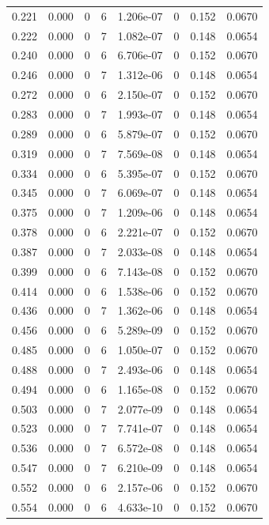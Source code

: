 \documentclass[preview]{standalone}
\begin{document}
{{\begin{tabular}{L{1.2cm}C{1.2cm} C{0.3cm}C{0.5cm} C{1.4cm}C{1.4cm} C{1.4cm}C{1.4cm}}
  0.221  &  0.000  & 0     &  6 &  1.206e-07  & 0  & 0.152 &  0.0670   \\ 
  0.222  &  0.000  & 0     &  7 &  1.082e-07  & 0  & 0.148 &  0.0654   \\ 
  0.240  &  0.000  & 0     &  6 &  6.706e-07  & 0  & 0.152 &  0.0670   \\ 
  0.246  &  0.000  & 0     &  7 &  1.312e-06  & 0  & 0.148 &  0.0654   \\ 
  0.272  &  0.000  & 0     &  6 &  2.150e-07  & 0  & 0.152 &  0.0670   \\ 
  0.283  &  0.000  & 0     &  7 &  1.993e-07  & 0  & 0.148 &  0.0654   \\ 
  0.289  &  0.000  & 0     &  6 &  5.879e-07  & 0  & 0.152 &  0.0670   \\ 
  0.319  &  0.000  & 0     &  7 &  7.569e-08  & 0  & 0.148 &  0.0654   \\ 
  0.334  &  0.000  & 0     &  6 &  5.395e-07  & 0  & 0.152 &  0.0670   \\ 
  0.345  &  0.000  & 0     &  7 &  6.069e-07  & 0  & 0.148 &  0.0654   \\ 
  0.375  &  0.000  & 0     &  7 &  1.209e-06  & 0  & 0.148 &  0.0654   \\ 
  0.378  &  0.000  & 0     &  6 &  2.221e-07  & 0  & 0.152 &  0.0670   \\ 
  0.387  &  0.000  & 0     &  7 &  2.033e-08  & 0  & 0.148 &  0.0654   \\ 
  0.399  &  0.000  & 0     &  6 &  7.143e-08  & 0  & 0.152 &  0.0670   \\ 
  0.414  &  0.000  & 0     &  6 &  1.538e-06  & 0  & 0.152 &  0.0670   \\ 
  0.436  &  0.000  & 0     &  7 &  1.362e-06  & 0  & 0.148 &  0.0654   \\ 
  0.456  &  0.000  & 0     &  6 &  5.289e-09  & 0  & 0.152 &  0.0670   \\ 
  0.485  &  0.000  & 0     &  6 &  1.050e-07  & 0  & 0.152 &  0.0670   \\ 
  0.488  &  0.000  & 0     &  7 &  2.493e-06  & 0  & 0.148 &  0.0654   \\ 
  0.494  &  0.000  & 0     &  6 &  1.165e-08  & 0  & 0.152 &  0.0670   \\ 
  0.503  &  0.000  & 0     &  7 &  2.077e-09  & 0  & 0.148 &  0.0654   \\ 
  0.523  &  0.000  & 0     &  7 &  7.741e-07  & 0  & 0.148 &  0.0654   \\ 
  0.536  &  0.000  & 0     &  7 &  6.572e-08  & 0  & 0.148 &  0.0654   \\ 
  0.547  &  0.000  & 0     &  7 &  6.210e-09  & 0  & 0.148 &  0.0654   \\ 
  0.552  &  0.000  & 0     &  6 &  2.157e-06  & 0  & 0.152 &  0.0670   \\ 
  0.554  &  0.000  & 0     &  6 &  4.633e-10  & 0  & 0.152 &  0.0670   \\ 
\hline 
\end{tabular} 

}}
\end{document}
